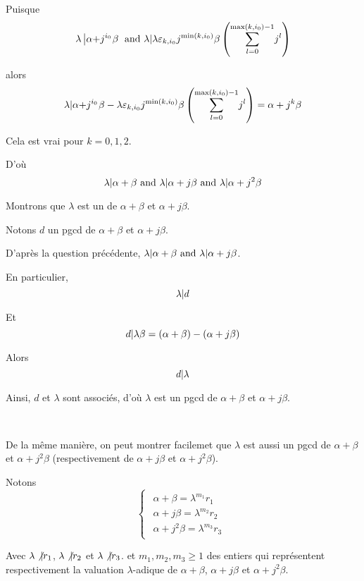 Puisque
\[ \lambda \left| \alpha {+ j^{i_0}}^{} \beta \right. \text{ and } \lambda |
    \lambda \varepsilon_{k, i_0} j^{\min (k, i_0)} \beta \left(
   \underset{l = 0}{\overset{\max (k, i_0) - 1}{\sum}} j^l \right) \]


alors
\[ \lambda |  \alpha {+ j^{i_0}}^{} \beta - \lambda \varepsilon_{k,
   i_0} j^{\min (k, i_0)} \beta \left( \underset{l = 0}{\overset{\max (k, i_0)
   - 1}{\sum}} j^l \right) = \alpha + j^k \beta \]


Cela est vrai pour $k = 0, 1, 2$.

D'o{\`u}
\[ \lambda  |  \alpha + \beta \text{ and } \lambda  | 
   \alpha + j \beta \text{ and } \lambda  |  \alpha + j^2 \beta \]


 Montrons que $\lambda$ est un  de $\alpha +
\beta$ et $\alpha + j \beta$.

Notons $d$ un pgcd de $\alpha + \beta$ et $\alpha + j \beta$.

D'apr{\`e}s la question pr{\'e}c{\'e}dente, $\lambda  |  \alpha +
\beta \text{ and } \lambda  |  \alpha + j \beta$.

En particulier,
\[ \lambda | d  \]


Et
\[ d | \lambda \beta = (\alpha + \beta) - (\alpha + j \beta)  \]


Alors
\[ d | \lambda  \]


Ainsi, $d$ et $\lambda$ sont associ{\'e}s, d'o{\`u} $\lambda$ est un pgcd de
$\alpha + \beta$ et $\alpha + j \beta$.

\

De la m{\^e}me mani{\`e}re, on peut montrer facilemet que $\lambda$ est aussi
un pgcd de $\alpha + \beta$ et $\alpha + j^2 \beta$ (respectivement de $\alpha
+ j \beta$ et $\alpha + j^2 \beta$).

Notons
\[ \left\{\begin{array}{l}
     \begin{array}{c}
       \alpha + \beta = \lambda^{m_1} r_1\\
       \alpha + j  \beta = \lambda^{m_2} r_2\\
       \alpha + j^2 \beta = \lambda^{m_3} r_3
     \end{array}
   \end{array}\right. \]


Avec $\lambda \not{| } r_1$, $\lambda \not{| } r_2$ et
$\lambda \not{| } r_3$. et $m_1, m_2, m_3 \geqslant 1$ des entiers
qui repr{\'e}sentent respectivement la valuation $\lambda$-adique de $\alpha +
\beta$, $\alpha + j \beta$ et $\alpha + j^2 \beta$.

